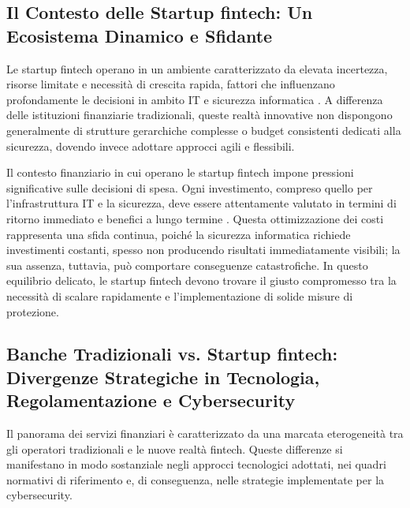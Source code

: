 \subsection{Il Contesto delle Startup fintech: Un Ecosistema Dinamico e Sfidante}

Le startup fintech operano in un ambiente caratterizzato da elevata incertezza, risorse limitate e necessità di crescita rapida, fattori che influenzano profondamente le decisioni in ambito IT e sicurezza informatica \cite{fintechChallenges}. A differenza delle istituzioni finanziarie tradizionali, queste realtà innovative non dispongono generalmente di strutture gerarchiche complesse o budget consistenti dedicati alla sicurezza, dovendo invece adottare approcci agili e flessibili.

Il contesto finanziario in cui operano le startup fintech impone pressioni significative sulle decisioni di spesa. Ogni investimento, compreso quello per l'infrastruttura IT e la sicurezza, deve essere attentamente valutato in termini di ritorno immediato e benefici a lungo termine \cite{fintechChallenges}. Questa ottimizzazione dei costi rappresenta una sfida continua, poiché la sicurezza informatica richiede investimenti costanti, spesso non producendo risultati immediatamente visibili; la sua assenza, tuttavia, può comportare conseguenze catastrofiche. In questo equilibrio delicato, le startup fintech devono trovare il giusto compromesso tra la necessità di scalare rapidamente e l'implementazione di solide misure di protezione.

\subsection{Banche Tradizionali vs. Startup fintech: Divergenze Strategiche in Tecnologia, Regolamentazione e Cybersecurity}
Il panorama dei servizi finanziari è caratterizzato da una marcata eterogeneità tra gli operatori tradizionali e le nuove realtà fintech. Queste differenze si manifestano in modo sostanziale negli approcci tecnologici adottati, nei quadri normativi di riferimento e, di conseguenza, nelle strategie implementate per la cybersecurity.

